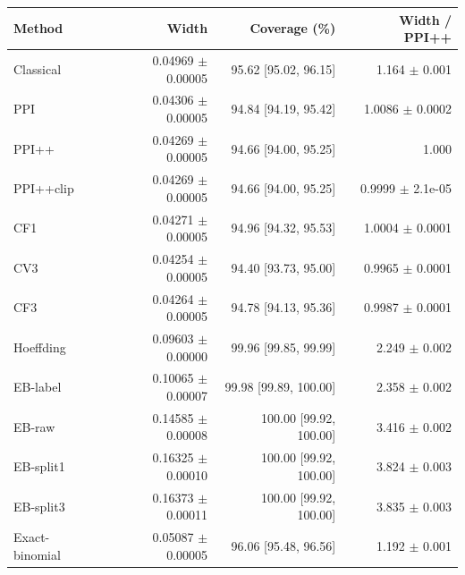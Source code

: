 \small
\begin{tabular}{lrrr}
\toprule
Method & Width & Coverage (\%) & Width / PPI++ \\
\midrule
Classical & 0.04969 $\pm$ 0.00005 & 95.62 [95.02, 96.15] & 1.164 $\pm$ 0.001 \\
PPI & 0.04306 $\pm$ 0.00005 & 94.84 [94.19, 95.42] & 1.0086 $\pm$ 0.0002 \\
PPI++ & 0.04269 $\pm$ 0.00005 & 94.66 [94.00, 95.25] & 1.000 \\
PPI++clip & 0.04269 $\pm$ 0.00005 & 94.66 [94.00, 95.25] & 0.9999 $\pm$ 2.1e-05 \\
CF1 & 0.04271 $\pm$ 0.00005 & 94.96 [94.32, 95.53] & 1.0004 $\pm$ 0.0001 \\
CV3 & 0.04254 $\pm$ 0.00005 & 94.40 [93.73, 95.00] & 0.9965 $\pm$ 0.0001 \\
CF3 & 0.04264 $\pm$ 0.00005 & 94.78 [94.13, 95.36] & 0.9987 $\pm$ 0.0001 \\
Hoeffding & 0.09603 $\pm$ 0.00000 & 99.96 [99.85, 99.99] & 2.249 $\pm$ 0.002 \\
EB-label & 0.10065 $\pm$ 0.00007 & 99.98 [99.89, 100.00] & 2.358 $\pm$ 0.002 \\
EB-raw & 0.14585 $\pm$ 0.00008 & 100.00 [99.92, 100.00] & 3.416 $\pm$ 0.002 \\
EB-split1 & 0.16325 $\pm$ 0.00010 & 100.00 [99.92, 100.00] & 3.824 $\pm$ 0.003 \\
EB-split3 & 0.16373 $\pm$ 0.00011 & 100.00 [99.92, 100.00] & 3.835 $\pm$ 0.003 \\
Exact-binomial & 0.05087 $\pm$ 0.00005 & 96.06 [95.48, 96.56] & 1.192 $\pm$ 0.001 \\
\bottomrule
\end{tabular}
